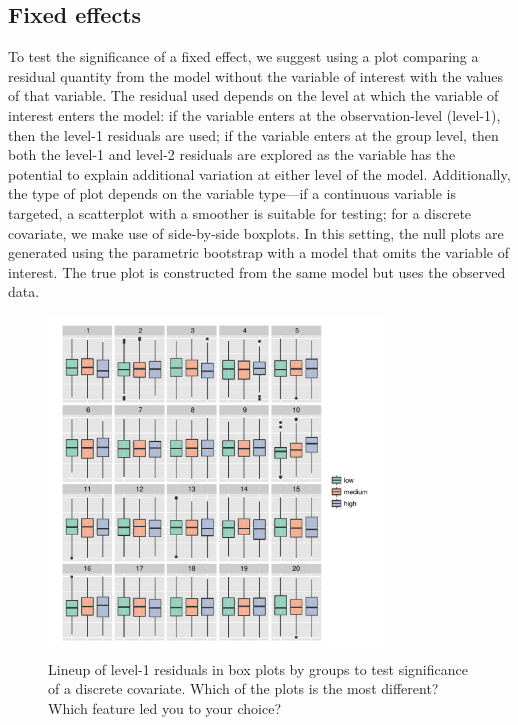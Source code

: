 \documentclass[12pt]{article} %
\newcommand{\alnote}[1]{\todo[inline,color=green!40]{#1}} %
\begin{document}
\subsection{Fixed effects} 
To test the significance of a fixed effect, we suggest using a plot comparing a residual quantity from the model without the variable of interest with the values of that variable. 
The residual used depends on the level at which the variable of interest enters the model: if the variable enters at the observation-level (level-1), then the level-1 residuals are used; if the variable enters at the group level, then both the level-1 and level-2 residuals are explored as the variable has the potential to explain additional variation at either level of the model.
Additionally, the type of plot depends on the variable type---if a continuous variable is targeted,  a scatterplot with a smoother is suitable for testing; for a discrete covariate, we make use of side-by-side boxplots. 
In this setting, the null plots are generated using the parametric bootstrap  with a model that omits the variable of interest. The true plot is constructed from the same model but uses the observed data. 

\begin{figure}[h]
	\centering
	\includegraphics[width=0.8\textwidth]{autism2-ordered-10.pdf}
	\caption{\label{fig:boxplot-ordered} {Lineup of level-1 residuals in box plots  by groups to test significance of a discrete covariate.}
	Which of the plots is the most different? Which feature led you to your choice?} 
\end{figure}
\end{document}
